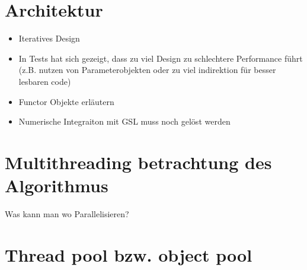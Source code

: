 \section{Architektur}



\begin{itemize}
    \item Iteratives Design 
    \item In Tests hat sich gezeigt, dass zu viel Design zu schlechtere Performance führt (z.B. nutzen von Parameterobjekten oder zu viel indirektion für besser lesbaren code)
    \item Functor Objekte erläutern
    \item Numerische Integraiton mit GSL muss noch gelöst werden
\end{itemize}

\section{Multithreading betrachtung des Algorithmus}

Was kann man wo Parallelisieren?

\section{Thread pool bzw. object pool}

